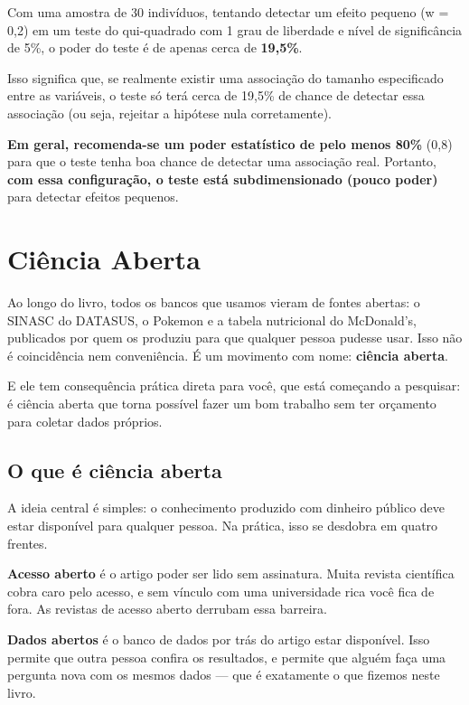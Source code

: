 \documentclass[
]{book}
\begin{document}
Com uma amostra de 30 indivíduos, tentando detectar um efeito pequeno (w = 0,2) em um teste do qui-quadrado com 1 grau de liberdade e nível de significância de 5\%, o poder do teste é de apenas cerca de \textbf{19,5\%}.

Isso significa que, se realmente existir uma associação do tamanho especificado entre as variáveis, o teste só terá cerca de 19,5\% de chance de detectar essa associação (ou seja, rejeitar a hipótese nula corretamente).

\textbf{Em geral, recomenda-se um poder estatístico de pelo menos 80\%} (0,8) para que o teste tenha boa chance de detectar uma associação real. Portanto, \textbf{com essa configuração, o teste está subdimensionado (pouco poder)} para detectar efeitos pequenos.

\chapter{Ciência Aberta}\label{ciuxeancia-aberta}

Ao longo do livro, todos os bancos que usamos vieram de fontes abertas: o SINASC do DATASUS, o Pokemon e a tabela nutricional do McDonald's, publicados por quem os produziu para que qualquer pessoa pudesse usar. Isso não é coincidência nem conveniência. É um movimento com nome: \textbf{ciência aberta}.

E ele tem consequência prática direta para você, que está começando a pesquisar: é ciência aberta que torna possível fazer um bom trabalho sem ter orçamento para coletar dados próprios.

\section{O que é ciência aberta}\label{o-que-uxe9-ciuxeancia-aberta}

A ideia central é simples: o conhecimento produzido com dinheiro público deve estar disponível para qualquer pessoa. Na prática, isso se desdobra em quatro frentes.

\textbf{Acesso aberto} é o artigo poder ser lido sem assinatura. Muita revista científica cobra caro pelo acesso, e sem vínculo com uma universidade rica você fica de fora. As revistas de acesso aberto derrubam essa barreira.

\textbf{Dados abertos} é o banco de dados por trás do artigo estar disponível. Isso permite que outra pessoa confira os resultados, e permite que alguém faça uma pergunta nova com os mesmos dados --- que é exatamente o que fizemos neste livro.
\end{document}
